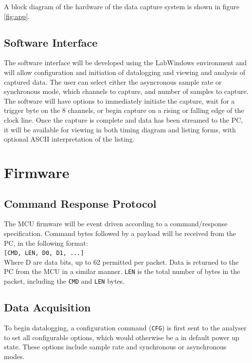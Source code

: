 \documentclass[11pt]{article}
\begin{document}
    A block diagram of the hardware of the data capture system is shown in figure \ref{fig:app}.
    
\subsection{Software Interface}
    The software interface will be developed using the LabWindows environment and will allow configuration and initiation of datalogging and viewing and analysis of captured data.  The user can select either the asyncronous sample rate or synchronous mode, which channels to capture, and number of samples to capture.  The software will have options to immediately initiate the capture, wait for a trigger byte on the 8 channels, or begin capture on a rising or falling edge of the clock line.  Once the capture is complete and data has been streamed to the PC, it will be available for viewing in both timing diagram and listing forms, with optional ASCII interpretation of the listing.

\section{Firmware}
\subsection{Command Response Protocol}
    The MCU firmware will be event driven according to a command/response
    specification. Command bytes followed by a payload will be received from the
    PC, in the following format: \\

    \texttt{[CMD, LEN, D0, D1,  ...]} \\

    Where D are data bits, up to 62 permitted per packet. Data is returned
    to the PC from the MCU in a similar manner. \texttt{LEN} is the total number
    of bytes in the packet, including the \texttt{CMD} and \texttt{LEN} bytes.

\subsection{Data Acquisition}
    To begin datalogging, a configuration command (\texttt{CFG}) 
    is first sent to the analyser
    to set all configurable options, which would otherwise be a in default power
    up state. These options include sample rate and synchronous or asynchronous
    modes.
\end{document}
